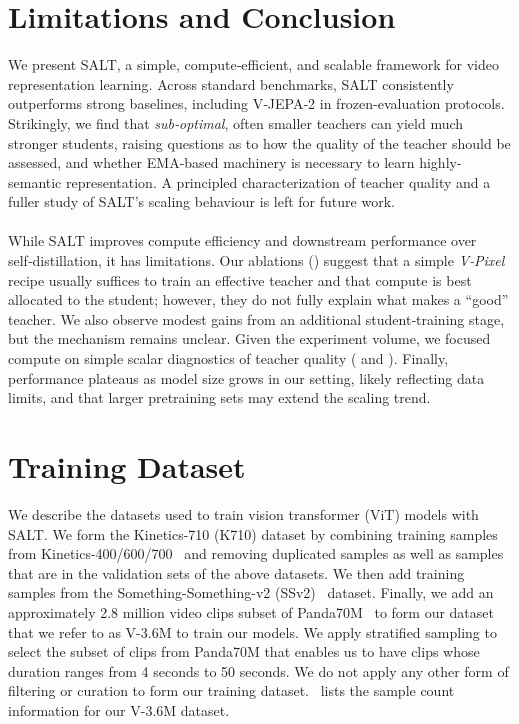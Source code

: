 \documentclass{applemlr}
\numberwithin{equation}{section}
\newcommand{\ourmethod}{SALT\xspace}
\begin{document}
\section{Limitations and Conclusion}
\label{sec:discussion}

We present \ourmethod, a simple, compute‑efficient, and scalable framework for video representation learning.  Across standard benchmarks, \ourmethod consistently outperforms strong baselines, including V‑JEPA‑2 in frozen-evaluation protocols. Strikingly, we find that \emph{sub‑optimal}, often smaller teachers can yield much stronger students, raising questions as to how the quality of the teacher should be assessed, and whether EMA-based machinery is necessary to learn highly-semantic representation. A principled characterization of teacher quality and a fuller study of \ourmethod’s scaling behaviour is left for future work.\\\\
While \ourmethod improves compute efficiency and downstream performance over self‑distillation, it has limitations. Our ablations () suggest that a simple \emph{V‑Pixel} recipe usually suffices to train an effective teacher and that compute is best allocated to the student; however, they do not fully explain what makes a “good” teacher. We also observe modest gains from an additional student‑training stage, but the mechanism remains unclear. Given the experiment volume, we focused compute on simple scalar diagnostics of teacher quality ( and ). Finally, performance plateaus as model size grows in our setting, likely reflecting data limits, and that larger pretraining sets may extend the scaling trend. 

\newpage



\clearpage
\newpage

\appendix

\section{Training Dataset}
\label{appendix:sec:training_data}

We describe the datasets used to train vision transformer (ViT) models with \ourmethod. We form the Kinetics-710 (K710) dataset by combining training samples from Kinetics-400/600/700~\citep{kay2017kinetics} and removing duplicated samples as well as samples that are in the validation sets of the above datasets. We then add training samples from the Something-Something-v2 (SSv2)~\citep{goyal2017something} dataset. Finally, we add an approximately 2.8 million video clips subset of Panda70M~\citep{chen2024panda70m} to form our dataset that we refer to as V-3.6M to train our models. We apply stratified sampling to select the subset of clips from Panda70M that enables us to have clips whose duration ranges from 4 seconds to 50 seconds. We do not apply any other form of filtering or curation to form our training dataset.~ lists the sample count information for our V-3.6M dataset.
\end{document}

